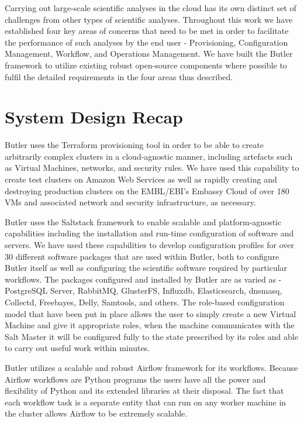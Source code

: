 Carrying out large-scale scientific analyses in the cloud has its own distinct set of challenges from other types of scientific analyses. Throughout this work we have established four key areas of concerns that need to be met in order to facilitate the performance of such analyses by the end user - Provisioning, Configuration Management, Workflow, and Operations Management. We have built the Butler framework to utilize existing robust open-source components where possible to fulfil the detailed requirements in the four areas thus described.

\section{System Design Recap}
Butler uses the Terraform provisioning tool in order to be able to create arbitrarily complex clusters in a cloud-agnostic manner, including artefacts such as Virtual Machines, networks, and security rules. We have used this capability to create test clusters on Amazon Web Services as well as rapidly creating and destroying production clusters on the EMBL/EBI's Embassy Cloud of over 180 VMs and associated network and security infrastructure, as necessary. 

Butler uses the Saltstack framework to enable scalable and platform-agnostic capabilities including the installation and run-time configuration of software and servers. We have used these capabilities to develop configuration profiles for over 30 different software packages that are used within Butler, both to configure Butler itself as well as configuring the scientific software required by particular workflows. The packages configured and installed by Butler are as varied as - PostgreSQL Server, RabbitMQ, GlusterFS, Influxdb, Elasticsearch, dnsmasq, Collectd, Freebayes, Delly, Samtools, and others. The role-based configuration model that have been put in place allows the user to simply create a new Virtual Machine and give it appropriate roles, when the machine communicates with the Salt Master it will be configured fully to the state prescribed by its roles and able to carry out useful work within minutes.

Butler utilizes a scalable and robust Airflow framework for its workflows. Because Airflow workflows are Python programs the users have all the power and flexibility of Python and its extended libraries at their disposal. The fact that each workflow task is a separate entity that can run on any worker machine in the cluster allows Airflow to be extremely scalable. 


